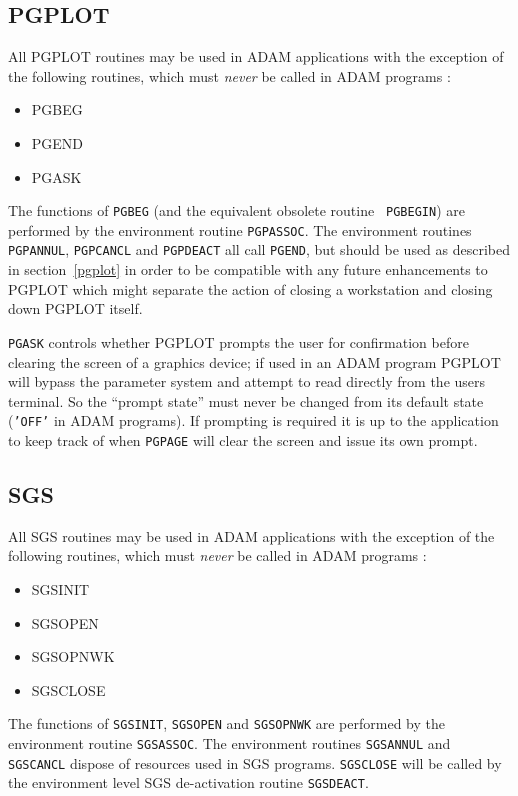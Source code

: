 \documentclass[twoside,11pt]{article}
\newcommand{\hyperref}[4]{#2\ref{#4}#3}
\newcommand{\htmlref}[2]{#1}
\newcommand{\xref}[3]{#1}
\renewcommand{\_}{\texttt{\symbol{95}}}
\begin{document}
\subsection{PGPLOT}

All PGPLOT routines may be used in ADAM applications with the exception of the
following routines, which must {\em never} be called in ADAM programs :
\begin{itemize}
\item \xref{PGBEG}{sun15}{PGBEG}
\item \xref{PGEND}{sun15}{PGEND}
\item \xref{PGASK}{sun15}{PGASK}
\end{itemize}
The functions of {\tt PGBEG} (and the equivalent obsolete routine {\tt 
PGBEGIN}) are performed by the environment routine 
\htmlref{{\tt PGP\_ASSOC}}{PGP_ASSOC}. The 
environment routines \htmlref{{\tt PGP\_ANNUL}}{PGP_ANNUL}, 
\htmlref{{\tt PGP\_CANCL}}{PGP_CANCL} and 
\htmlref{{\tt PGP\_DEACT}}{PGP_DEACT} all call {\tt PGEND}, 
but should be used as
described \hyperref{here}{in section~}{}{pgplot} in order to be compatible 
with any future
enhancements to PGPLOT which might separate the action of closing a
workstation and closing down PGPLOT itself.

{\tt PGASK} controls whether PGPLOT prompts the user for confirmation before 
clearing
the screen of a graphics device; if used in an ADAM program PGPLOT will bypass
the parameter system and attempt to read directly from the users terminal. So
the ``prompt state'' must never be changed from its 
default state ({\tt{'OFF'}} in
ADAM programs). If prompting is required it is up to the application to keep
track of when 
\xref{{\tt PGPAGE}}{sun15}{PGPAGE}
will clear the screen and issue its own prompt.

\subsection{SGS}

All SGS routines may be used in ADAM applications with the exception of the
following routines, which must {\em never} be called in ADAM programs :
\begin{itemize}
\item \xref{SGS\_INIT}{sun85}{SGS_INIT}
\item \xref{SGS\_OPEN}{sun85}{SGS_OPEN}
\item \xref{SGS\_OPNWK}{sun85}{SGS_OPNWK}
\item \xref{SGS\_CLOSE}{sun85}{SGS_CLOSE}
\end{itemize}
The functions of {\tt SGS\_INIT}, {\tt SGS\_OPEN} and {\tt SGS\_OPNWK} are 
performed by the environment routine \htmlref{{\tt SGS\_ASSOC}}{SGS_ASSOC}.
The environment routines \htmlref{{\tt SGS\_ANNUL}}{SGS_ANNUL}
and \htmlref{{\tt SGS\_CANCL}}{SGS_CANCL} dispose of 
resources used in SGS programs.  {\tt SGS\_CLOSE} will be called by the 
environment level SGS de-activation routine 
\htmlref{{\tt SGS\_DEACT}}{SGS_DEACT}.
\end{document}
